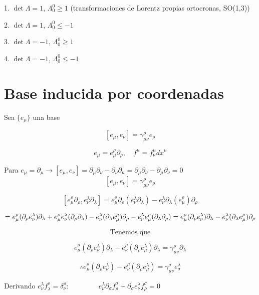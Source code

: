 \documentclass{article}
\begin{document}
1. \(\det \Lambda = 1\), \(\Lambda^0_0 \geq 1\) (transformaciones de Lorentz propias ortocronas, SO(1,3))

2. \(\det \Lambda = 1\), \(\Lambda^0_0 \leq -1\)

3. \(\det \Lambda = -1\), \(\Lambda^0_0 \geq 1\)

4. \(\det \Lambda = -1\), \(\Lambda^0_0 \leq -1\)




\section{Base inducida por coordenadas }
Sea $\{e_\mu\}$ una base

\[
[e_\mu, e_\nu] = \gamma^\rho_{\mu \nu} e_\rho
\]

\[
e_\mu = e_\mu^\rho \partial_\rho, \quad f^\mu = f^\mu_\nu dx^\nu
\]

Para $e_\mu = \partial_\mu \to [e_\mu, e_\nu] = \partial_\mu \partial_\nu - \partial_\nu \partial_\mu = \partial_\mu \partial_\nu - \partial_\mu \partial_\nu = 0$
\[
[e_\mu, e_\nu] = \gamma^\rho_{\mu \nu} e_\rho
\]

\[
[e_\mu^\rho \partial_\rho, e_\nu^\lambda \partial_\lambda] = e_\mu^\rho \partial_\rho (e_\nu^\lambda \partial_\lambda) - e_\nu^\lambda \partial_\lambda (e_\mu^\rho) \partial_\rho
\]

\[
= e_\mu^\rho (\partial_\rho e_\nu^\lambda) \partial_\lambda + e_\mu^\rho e_\nu^\lambda (\partial_\rho \partial_\lambda) - e_\nu^\lambda (\partial_\lambda e_\mu^\rho) \partial_\rho - e_\nu^\lambda e_\mu^\rho (\partial_\lambda \partial_\rho) \\
= e_\mu^\rho (\partial_\rho e_\nu^\lambda) \partial_\lambda - e_\nu^\lambda (\partial_\lambda e_\mu^\rho) \partial_\rho
\]

\[
\text{Tenemos que}
\]

\[
e_\mu^\rho (\partial_\rho e_\nu^\lambda) \partial_\lambda - e_\nu^\rho (\partial_\rho e_\mu^\lambda) \partial_\lambda = \gamma^\rho_{\mu \nu} \partial_\lambda
\]

\[
\therefore e_\mu^\rho (\partial_\rho e_\nu^\lambda) - e_\nu^\rho (\partial_\rho e_\mu^\lambda) = \gamma^\sigma_{\mu \nu} e_\sigma^\lambda
\]


\hfill 


\hfill 


\hfill 

Derivando $ e_\nu^\lambda f_\lambda^\rho = \delta_\nu^\rho$: $ \qquad \qquad  e_{\nu}^{\lambda} \partial_\sigma f_{\rho}^{\sigma} + \partial_\sigma e_{\nu}^{\lambda} f_{\rho}^{\sigma} = 0$
\end{document}
